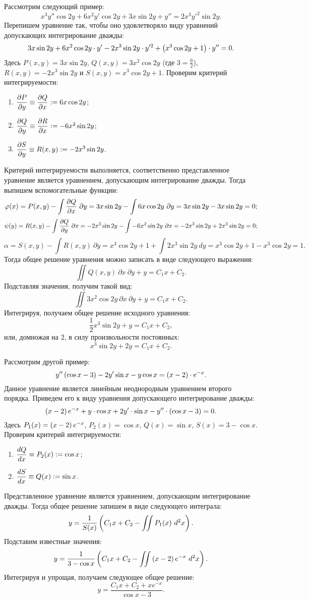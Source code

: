 		Рассмотрим следующий пример:
		\[ x^3 y'' \cos{2y} + 6 x^2 y' \cos{2y} + 3x \sin{2y} + y'' = 2 x^3 y'^2 \sin{2y}. \]
		Перепишем уравнение так, чтобы оно удовлетворяло виду уравнений допускающих интегрирование дважды:
		\[ 3x \sin{2y} + 6 x^2 \cos{2y} \cdot y' - 2 x^3 \sin{2y} \cdot y'^2 + \left( x^3 \cos{2y} + 1 \right) \cdot y'' = 0. \]
		Здесь $P(x, y) = 3x \sin{2y}$, $Q(x, y) = 3x^2 \cos{2y}$ (где $3 = \frac{6}{2}$), $R(x, y) = -2 x^3 \sin{2y}$ и $S(x, y) = x^3 \cos{2y} + 1$. Проверим критерий интегрируемости:
		\begin{enumerate}
			\item \( \dfrac{\partial P}{\partial y} \equiv \dfrac{\partial Q}{\partial x} := 6x \cos{2y} \);
			\item \( \dfrac{\partial Q}{\partial y} \equiv \dfrac{\partial R}{\partial x} := -6x^2 \sin{2y} \);
			\item \( \dfrac{\partial S}{\partial y} \equiv R(x, y) := -2 x^3 \sin{2y} \).
		\end{enumerate}
		Критерий интегрируемости выполняется, соответственно представленное уравнение является уравнением, допускающим интегрирование дважды. Тогда выпишем вспомогательные функции:
		\[ \varphi(x) = P(x, y) - \int \dfrac{\partial Q}{\partial x} ~ \partial y = 3x \sin{2y} - \int 6x \cos{2y} ~ \partial y = 3x \sin{2y} - 3x \sin{2y} = 0; \]
		\[ \psi(y) = R(x, y) - \int \dfrac{\partial Q}{\partial y} ~ \partial x = -2 x^3 \sin{2y} - \int -6x^2 \sin{2y} ~ \partial x = -2 x^3 \sin{2y} + 2 x^3 \sin{2y} = 0; \]
		\[ \alpha = S(x, y) - \int R(x, y) ~ \partial y = x^3 \cos{2y} + 1 + \int 2 x^3 \sin{2y} ~ dy = x^3 \cos{2y} + 1 - x^3 \cos{2y} = 1. \]
		Тогда общее решение уравнения можно записать в виде следующего выражения:
		\[ \iint Q(x, y) ~ \partial x ~ \partial y + y = C_1 x + C_2. \]
		Подставляя значения, получим такой вид:
		\[ \iint 3x^2 \cos{2y} ~ \partial x ~ \partial y + y = C_1 x + C_2. \]
		Интегрируя, получаем общее решение исходного уравнения:
		\[ \frac{1}{2} x^3 \sin{2y} + y = C_1 x + C_2, \]
		или, домножая на $2$, в силу произвольности постоянных:
		\[ x^3 \sin{2y} + 2y = C_1 x + C_2. \]

		Рассмотрим другой пример:
		\[ y'' \left( \cos{x} - 3 \right) - 2y' \sin{x} - y \cos{x} = \left( x - 2 \right) \cdot e^{-x}. \]
		Данное уравнение является линейным неоднородным уравнением второго порядка. Приведем его к виду уравнения допускающего интегрирование дважды:
		\[ \left( x - 2 \right) e^{-x} + y \cdot \cos{x} + 2y' \cdot \sin{x} - y'' \cdot \left( \cos{x} - 3 \right) = 0. \]
		Здесь $P_1(x) = \left( x - 2 \right) e^{-x}$, $P_2(x) = \cos{x}$, $Q(x) = \sin{x}$, $S(x) = 3 - \cos{x}$. Проверим критерий интегрируемости:
		\begin{enumerate}
			\item \( \dfrac{d Q}{d x} \equiv P_2(x) := \cos{x} \);
			\item \( \dfrac{d S}{d x} \equiv Q(x) := \sin{x} \).
		\end{enumerate}
		Представленное уравнение является уравнением, допускающим интегрирование дважды. Тогда общее решение запишем в виде следующего интеграла:
		\[ y = \frac{1}{S(x)} \left( C_1 x + C_2 - \iint P_1(x) ~ d^2 x \right). \]
		Подставим известные значения:
		\[ y = \frac{1}{3 - \cos{x}} \left( C_1 x + C_2 - \iint \left( x - 2 \right) e^{-x} ~ d^2 x \right). \]
		Интегрируя и упрощая, получаем следующее общее решение:
		\[ y = \frac{C_1x + C_2 + xe^{-x}}{\cos{x} - 3}. \]

